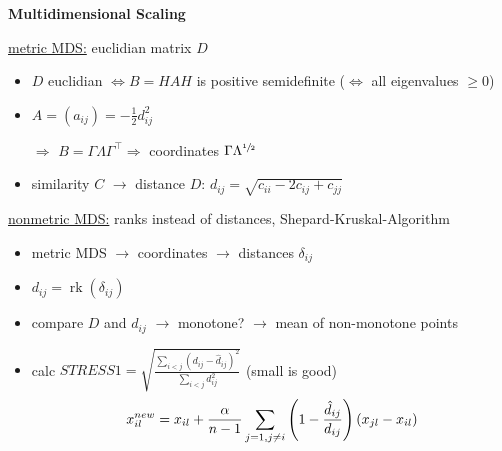 \documentclass[10pt,landscape,a4paper]{article}
\DeclareMathOperator{\rk}{rk}
\begin{document}
\begin{multicols*}{4}
\begin{center}
	\normalsize{\textbf{Multidimensional Scaling}} \\
\end{center}
\underline{metric MDS:} euclidian matrix $D$
\begin{itemize}
	\item $D$ euclidian $\Leftrightarrow B = HAH$ is positive semidefinite ($\Leftrightarrow$ all eigenvalues $\ge 0$)
	\item $A = (a_{ij}) = -\frac{1}{2} d_{ij}^2$
	\item[$\Rightarrow$] $B = \Gamma\Lambda\Gamma^\top \Rightarrow$ coordinates $\Gamma\Lambda^{\sfrac{1}{2}}$
	\item similarity $C$ $\to$ distance $D$: $d_{ij} = \sqrt{c_{ii} - 2c_{ij} + c_{jj}}$
\end{itemize}
\underline{nonmetric MDS:} ranks instead of distances, Shepard-Kruskal-Algorithm
\begin{itemize}
	\item metric MDS $\to$ coordinates $\to$ distances $\delta_{ij}$
	\item $d_{ij} = \rk(\delta_{ij})$
	\item compare $D$ and $d_{ij}$ $\to$ monotone? $\to$ mean of non-monotone points
	\item calc $STRESS1 = \sqrt{\frac{\sum_{i<j} (d_{ij} - \hat{d}_{ij})^2}{\sum_{i<j} d_{ij}^2}}$ (small is good)
	\begin{align}
		x_{il}^{new} = x_{il} + \frac{\alpha}{n-1}\sum_{j=1,j\neq i} \left(1-\frac{\hat{d}_{ij}}{d_{ij}}\right)(x_{jl} - x_{il}) \notag
	\end{align}
\end{itemize}


\end{multicols*}
\end{document}
